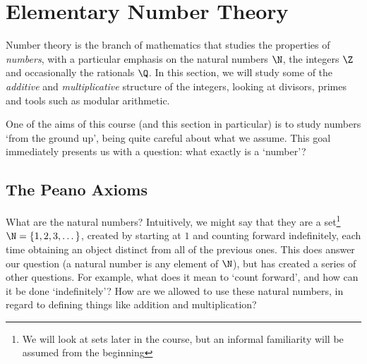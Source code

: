 




\section{Elementary Number Theory}\label{ch:1}

Number theory is the branch of mathematics that studies the properties of \emph{numbers}, with a particular emphasis on the natural numbers $\N$, the integers $\Z$ and occasionally the rationals $\Q$. In this section, we will study some of the \emph{additive} and \emph{multiplicative} structure of the integers, looking at divisors, primes and tools such as modular arithmetic. 

One of the aims of this course (and this section in particular) is to study numbers `from the ground up', being quite careful about what we assume. This goal immediately presents us with a question: what exactly is a `number'?


\subsection{The Peano Axioms}

What are the natural numbers? Intuitively, we might say that they are a set\footnote{We will look at sets later in the course, but an informal familiarity will be assumed from the beginning} $\N = \{1, 2, 3, \dots\}$, created by starting at $1$ and counting forward indefinitely, each time obtaining an object distinct from all of the previous ones.
	This does answer our question (a natural number is any element of $\N$), but has created a series of other questions. For example, what does it mean to `count forward', and how can it be done `indefinitely'? How are we allowed to use these natural numbers, in regard to defining things like addition and multiplication? 
	
